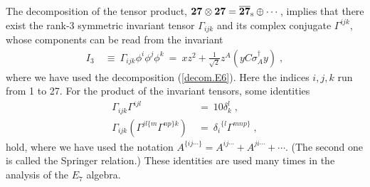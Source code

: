 \documentclass[a4paper,11pt]{article}
\newcommand{\ol}{\overline}
\newcommand{\bsubeq}{\begin{subequations}}
\newcommand{\esubeq}{\end{subequations}}
\begin{document}
{The decomposition of the tensor product, 
${\bf 27} \otimes {\bf 27} = {\bf \ol{27}}_{\rm s} \oplus \cdots$, 
implies that there exist the rank-$3$ symmetric 
invariant tensor $\Gamma_{ijk}$ and 
its complex conjugate $\Gamma^{ijk}$, 
whose components can be read from the invariant~\cite{KS}
\begin{align}
 I_3 \ &\equiv \ \Gamma_{ijk} \phi^i \phi^j \phi^k  
   \ = \ x z^2 + \frac{1}{\sqrt{2}} 
   z^A ( y C \sigma_A^{\dagger} y ) \; ,\label{I3}
\end{align}
where we have used the decomposition (\ref{decom.E6}).
Here the indices $i,j,k$ run from 1 to 27.
For the product of the invariant tensors, 
some identities 
\bsubeq
\begin{align}
 \Gamma_{ijk}\Gamma^{ijl} \ &= \ 10 \delta_k^l 
 \; , \label{E6-id.} \\
 \Gamma_{ijk}(\Gamma^{jl\{m}\Gamma^{np\}k}) 
\ &= \ {\delta_i}^{\{l} \Gamma^{mnp\}} \; , \label{Springer}
\end{align}
\esubeq
hold, where we have used the notation 
$A^{\{ij\cdots\}}=A^{ij\cdots} + A^{ji\cdots} + \cdots$.
(The second one is called the Springer relation.)
These identities are used many times 
in the analysis of the $E_7$ algebra.

}
\end{document}
